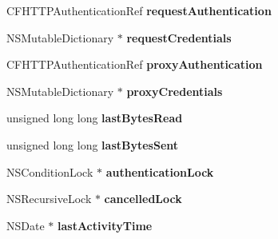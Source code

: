 \begin{DoxyCompactItemize}
\item 
\hypertarget{interface_a_s_i_h_t_t_p_request_af38049645f3c56d1750ecb6cbc608bb2}{
CFHTTPAuthenticationRef {\bfseries requestAuthentication}}
\label{interface_a_s_i_h_t_t_p_request_af38049645f3c56d1750ecb6cbc608bb2}

\item 
\hypertarget{interface_a_s_i_h_t_t_p_request_a670a2b5a3a03e17bfeafaffac01980e2}{
NSMutableDictionary $\ast$ {\bfseries requestCredentials}}
\label{interface_a_s_i_h_t_t_p_request_a670a2b5a3a03e17bfeafaffac01980e2}

\item 
\hypertarget{interface_a_s_i_h_t_t_p_request_aec0b048cf5c5fa2c8ad817d54f9b17ab}{
CFHTTPAuthenticationRef {\bfseries proxyAuthentication}}
\label{interface_a_s_i_h_t_t_p_request_aec0b048cf5c5fa2c8ad817d54f9b17ab}

\item 
\hypertarget{interface_a_s_i_h_t_t_p_request_a6bbee4bd105af8fbee12d5f4602dc8a6}{
NSMutableDictionary $\ast$ {\bfseries proxyCredentials}}
\label{interface_a_s_i_h_t_t_p_request_a6bbee4bd105af8fbee12d5f4602dc8a6}

\item 
\hypertarget{interface_a_s_i_h_t_t_p_request_a2a8e22b7d7e6a869a38d97fa038bef9a}{
unsigned long long {\bfseries lastBytesRead}}
\label{interface_a_s_i_h_t_t_p_request_a2a8e22b7d7e6a869a38d97fa038bef9a}

\item 
\hypertarget{interface_a_s_i_h_t_t_p_request_ad4f78760c1f5fb59653c36fd9c7c209f}{
unsigned long long {\bfseries lastBytesSent}}
\label{interface_a_s_i_h_t_t_p_request_ad4f78760c1f5fb59653c36fd9c7c209f}

\item 
\hypertarget{interface_a_s_i_h_t_t_p_request_af8d24500fdf9a04aa7227bee208317c5}{
NSConditionLock $\ast$ {\bfseries authenticationLock}}
\label{interface_a_s_i_h_t_t_p_request_af8d24500fdf9a04aa7227bee208317c5}

\item 
\hypertarget{interface_a_s_i_h_t_t_p_request_ad4ce9473bdf03a2d381690defc2f59bf}{
NSRecursiveLock $\ast$ {\bfseries cancelledLock}}
\label{interface_a_s_i_h_t_t_p_request_ad4ce9473bdf03a2d381690defc2f59bf}

\item 
\hypertarget{interface_a_s_i_h_t_t_p_request_a63b70ac3276c514fdb53202a4d1c6078}{
NSDate $\ast$ {\bfseries lastActivityTime}}
\label{interface_a_s_i_h_t_t_p_request_a63b70ac3276c514fdb53202a4d1c6078}


\end{DoxyCompactItemize}
